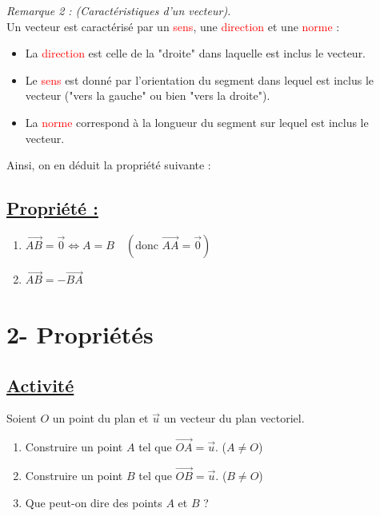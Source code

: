 \documentclass{article}
\begin{document}
\vspace{1em}

\textit{\color{red}Remarque 2 : (Caractéristiques d'un vecteur).}\\
Un vecteur est caractérisé par un \textcolor{red}{sens}, une \textcolor{red}{direction} et une \textcolor{red}{norme} :

\begin{itemize}
    \item[$*_{1}$] La \textcolor{red}{direction} est celle de la "droite" dans laquelle est inclus le vecteur.
    \item[$*_{2}$] Le \textcolor{red}{sens} est donné par l'orientation du segment dans lequel est inclus le vecteur ("vers la gauche" ou bien "vers la droite").
    \item[$*_{3}$] La \textcolor{red}{norme} correspond à la longueur du segment sur lequel est inclus le vecteur.
\end{itemize}

Ainsi, on en déduit la propriété suivante :

\subsection*{\underline{\color{red}Propriété :}}
\begin{enumerate}
    \item[i)] $\overrightarrow{AB} = \vec{0} \iff A = B \quad (\text{donc } \overrightarrow{AA} = \vec{0})$
    \item[ii)] $\overrightarrow{AB} = -\overrightarrow{BA}$
\end{enumerate}

\section*{2- Propriétés}
\subsection*{\underline{\color{red}Activité}}
Soient $O$ un point du plan et $\vec{u}$ un vecteur du plan vectoriel.
\begin{enumerate}
    \item[i)] Construire un point $A$ tel que $\overrightarrow{OA} = \vec{u}$. ($A \neq O$)
    \item[ii)] Construire un point $B$ tel que $\overrightarrow{OB} = \vec{u}$. ($B \neq O$)
    \item[iii)] Que peut-on dire des points $A$ et $B$ ?
\end{enumerate}
\end{document}
